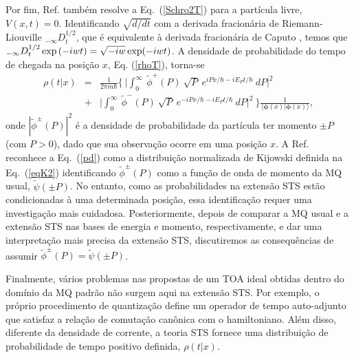 Por fim, Ref. \cite{Dias} também resolve a Eq.~(\ref{Schro2T}) para a partícula livre, $V(x,t)=0$. Identificando $\sqrt{d/dt}$ com a derivada fracionária de Riemann-Liouville $_{-\infty}D^{1/2}_t$, que é equivalente à derivada fracionária de Caputo \cite{caputo}, temos que $_{-\infty}D^{1/2}_t \exp\\(-iwt)=\sqrt{-iw} \exp(-iwt)$. A densidade de probabilidade do tempo de chegada na posição $x$, Eq. (\ref{rhoT}), torna-se
\begin{eqnarray} \label{pd}
\rho(t|x)&=& \frac{1}{2\pi m\hbar}
\Bigg\{~{\Bigg|}\int_0^{\infty}~{\tilde \phi}^+(P)~\sqrt{P}~{
e}^{iPx/\hbar-iE_P t/\hbar}~dP{\Bigg |}^2
\nonumber\\
&+& {\Bigg |} \int_0^{\infty}~{\tilde \phi}^-(P)~\sqrt{P}~{ e}^{-iPx/\hbar -
iE_P t/\hbar}~dP{\Bigg |}^2 ~\Bigg\} \frac{1}{\langle \pmb{\phi}(x) | \pmb{\phi}(x) \rangle},
\end{eqnarray}
onde $|{\tilde \phi}^{\pm}(P)|^2$ é a densidade de probabilidade da partícula ter momento $\pm P $ (com $P>0$), dado que sua observação ocorre em uma posição $x$. A  Ref.~\cite{Dias} reconhece a Eq.~(\ref{pd}) como a distribuição normalizada de Kijowski definida na Eq.~(\ref{eqK2}) identificando ${\tilde \phi}^{\pm}(P)$ como a função de onda de momento da MQ usual, ${\tilde \psi}(\pm P)$. No entanto, como as probabilidades na extensão STS estão condicionadas à uma determinada posição, essa identificação requer uma investigação mais cuidadosa. Posteriormente, depois de comparar a MQ usual e a extensão STS nas bases de energia e momento, respectivamente, e dar uma interpretação mais precisa da extensão STS, discutiremos as consequências de assumir ${\tilde \phi}^\pm(P)= {\tilde \psi}(\pm P)$.

Finalmente, vários problemas nas propostas de um TOA ideal obtidas dentro do domínio da MQ padrão não surgem aqui na extensão STS. Por exemplo, o próprio procedimento de quantização define um operador de tempo auto-adjunto que satisfaz a relação de comutação canônica com o hamiltoniano. Além disso, diferente da densidade de corrente, a teoria STS fornece uma distribuição de probabilidade de tempo positivo definida, $\rho(t|x)$.





